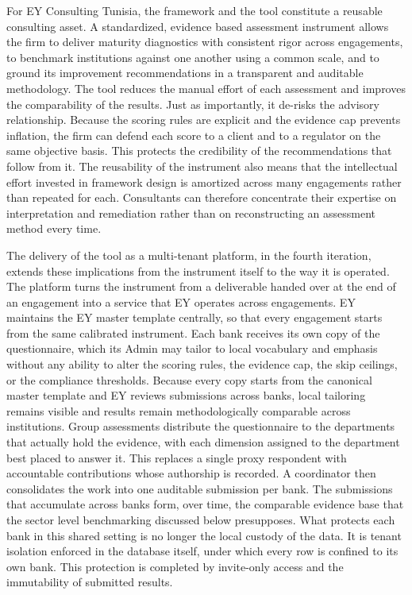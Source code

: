 For EY Consulting Tunisia, the framework and the tool constitute a reusable consulting asset. A standardized, evidence based assessment instrument allows the firm to deliver maturity diagnostics with consistent rigor across engagements, to benchmark institutions against one another using a common scale, and to ground its improvement recommendations in a transparent and auditable methodology. The tool reduces the manual effort of each assessment and improves the comparability of the results. Just as importantly, it de-risks the advisory relationship. Because the scoring rules are explicit and the evidence cap prevents inflation, the firm can defend each score to a client and to a regulator on the same objective basis. This protects the credibility of the recommendations that follow from it. The reusability of the instrument also means that the intellectual effort invested in framework design is amortized across many engagements rather than repeated for each. Consultants can therefore concentrate their expertise on interpretation and remediation rather than on reconstructing an assessment method every time.

The delivery of the tool as a multi-tenant platform, in the fourth iteration, extends these implications from the instrument itself to the way it is operated. The platform turns the instrument from a deliverable handed over at the end of an engagement into a service that EY operates across engagements. EY maintains the EY master template centrally, so that every engagement starts from the same calibrated instrument. Each bank receives its own copy of the questionnaire, which its Admin may tailor to local vocabulary and emphasis without any ability to alter the scoring rules, the evidence cap, the skip ceilings, or the compliance thresholds. Because every copy starts from the canonical master template and EY reviews submissions across banks, local tailoring remains visible and results remain methodologically comparable across institutions. Group assessments distribute the questionnaire to the departments that actually hold the evidence, with each dimension assigned to the department best placed to answer it. This replaces a single proxy respondent with accountable contributions whose authorship is recorded. A coordinator then consolidates the work into one auditable submission per bank. The submissions that accumulate across banks form, over time, the comparable evidence base that the sector level benchmarking discussed below presupposes. What protects each bank in this shared setting is no longer the local custody of the data. It is tenant isolation enforced in the database itself, under which every row is confined to its own bank. This protection is completed by invite-only access and the immutability of submitted results.

